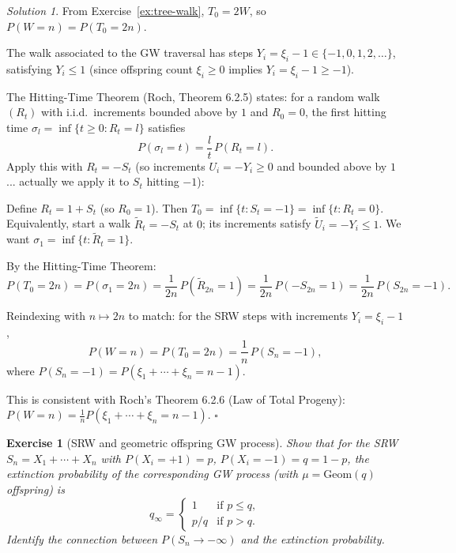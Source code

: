 \documentclass[12pt]{article}
\newtheorem{exercise}{Exercise}
\theoremstyle{remark}
\newtheorem*{solution}{Solution}
\begin{document}
\begin{solution}
From Exercise~\ref{ex:tree-walk}, $T_0 = 2W$, so $P(W = n) = P(T_0 = 2n)$.

The walk associated to the GW traversal has steps $Y_i = \xi_i - 1 \in \{-1, 0, 1, 2, \ldots\}$,
satisfying $Y_i \le 1$ (since offspring count $\xi_i \ge 0$ implies $Y_i = \xi_i - 1 \ge -1$).

The Hitting-Time Theorem (Roch, Theorem 6.2.5) states: for a random walk $(R_t)$ with
i.i.d.\ increments bounded above by $1$ and $R_0 = 0$, the first hitting time
$\sigma_l = \inf\{t \ge 0: R_t = l\}$ satisfies
\[
  P(\sigma_l = t) = \frac{l}{t}\,P(R_t = l).
\]
Apply this with $R_t = -S_t$ (so increments $U_i = -Y_i \ge 0$ and bounded above by
$1$... actually we apply it to $S_t$ hitting $-1$):

Define $R_t = 1 + S_t$ (so $R_0 = 1$).  Then $T_0 = \inf\{t: S_t = -1\} = \inf\{t: R_t = 0\}$.
Equivalently, start a walk $\tilde{R}_t = -S_t$ at $0$; its increments satisfy
$\tilde{U}_i = -Y_i \le 1$.  We want $\sigma_1 = \inf\{t: \tilde{R}_t = 1\}$.

By the Hitting-Time Theorem:
\[
  P(T_0 = 2n) = P(\sigma_1 = 2n) = \frac{1}{2n}\,P(\tilde{R}_{2n} = 1) = \frac{1}{2n}\,P(-S_{2n} = 1) = \frac{1}{2n}\,P(S_{2n} = -1).
\]

Reindexing with $n \mapsto 2n$ to match: for the SRW steps with increments $Y_i = \xi_i - 1$,
\[
  P(W = n) = P(T_0 = 2n) = \frac{1}{n}\,P(S_n = -1),
\]
where $P(S_n = -1) = P(\xi_1 + \cdots + \xi_n = n - 1)$.

\medskip
This is consistent with Roch's Theorem 6.2.6 (Law of Total Progeny):
$P(W = n) = \frac{1}{n}P(\xi_1 + \cdots + \xi_n = n-1)$. \hfill$\square$
\end{solution}

\begin{exercise}[SRW and geometric offspring GW process]
Show that for the SRW $S_n = X_1 + \cdots + X_n$ with $P(X_i = +1) = p$,
$P(X_i = -1) = q = 1-p$, the extinction probability of the corresponding GW process
(with $\mu = \mathrm{Geom}(q)$ offspring) is
\[
  q_\infty = \begin{cases} 1 & \text{if } p \le q, \\ p/q & \text{if } p > q. \end{cases}
\]
Identify the connection between $P(S_n \to -\infty)$ and the extinction probability.
\end{exercise}
\end{document}
